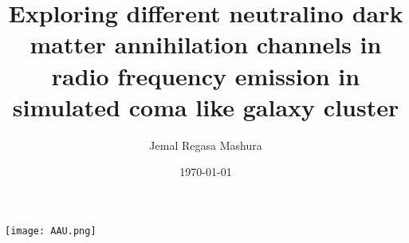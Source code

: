 \documentclass[10pt]{beamer}
\title [Thesis presentation]{Exploring different neutralino dark matter annihilation channels in radio frequency emission in simulated coma like galaxy cluster}
\author{Jemal Regasa Mashura}
\institute{Advisor: Dr. Remudin Reshid}
\date{\today}
\begin{document}
\begin{frame}
\begin{center}
\texttt{[image: AAU.png]} 
\end{center}
\titlepage
\end{frame}
\end{document}
